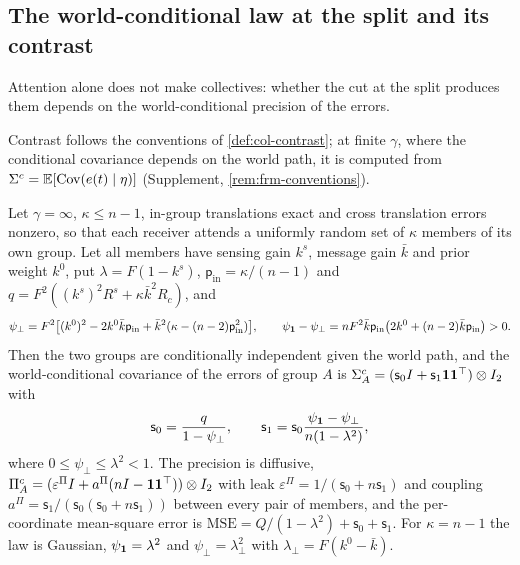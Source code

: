 \subsection{The world-conditional law at the split and its contrast}\label{sec:frm-contrast}

Attention alone does not make collectives: whether the cut at the split produces them depends on the world-conditional precision of the errors.

Contrast follows the conventions of \cref{def:col-contrast}; at finite $\gamma$, where the conditional covariance depends on the world path, it is computed from $\Sigma^c=\mathbb{E}[\operatorname{Cov}(e(t)\mid\eta)]$ (Supplement, \cref{rem:frm-conventions}).

\begin{lemma}\label{lem:frm-split-law}
Let $\gamma=\infty$, $\kappa\le n-1$, in-group translations exact and cross translation errors nonzero, so that each receiver attends a uniformly random set of $\kappa$ members of its own group. Let all members have sensing gain $k^s$, message gain $\bar k$ and prior weight $k^0$, put $\lambda=F(1-k^s)$, $\mathsf p_{\mathrm{in}}=\kappa/(n-1)$ and $q=F^2((k^s)^2R^s+\kappa\bar k^2R_c)$, and
\begin{equation*}
\psi_\perp=F^2\bigl[(k^0)^2-2k^0\bar k\mathsf p_{\mathrm{in}}+\bar k^2(\kappa-(n-2)\mathsf p_{\mathrm{in}}^2)\bigr],\qquad\psi_{\mathbf{1}}-\psi_\perp=nF^2\bar k\mathsf p_{\mathrm{in}}\bigl(2k^0+(n-2)\bar k\mathsf p_{\mathrm{in}}\bigr)>0.
\end{equation*}
Then the two groups are conditionally independent given the world path, and the world-conditional covariance of the errors of group $A$ is $\Sigma^c_A=(\mathsf s_0I+\mathsf s_1\mathbf{1}\mathbf{1}^\top)\otimes I_2$ with
\begin{equation*}
\mathsf s_0=\frac{q}{1-\psi_\perp},\qquad\mathsf s_1=\mathsf s_0\frac{\psi_{\mathbf{1}}-\psi_\perp}{n(1-\lambda^2)},
\end{equation*}
where $0\le\psi_\perp\le\lambda^2<1$. The precision is diffusive, $\Pi^c_A=(\varepsilon^\Pi I+a^\Pi(nI-\mathbf{1}\mathbf{1}^\top))\otimes I_2$ with leak $\varepsilon^\Pi=1/(\mathsf s_0+n\mathsf s_1)$ and coupling $a^\Pi=\mathsf s_1/(\mathsf s_0(\mathsf s_0+n\mathsf s_1))$ between every pair of members, and the per-coordinate mean-square error is $\mathrm{MSE}=Q/(1-\lambda^2)+\mathsf s_0+\mathsf s_1$. For $\kappa=n-1$ the law is Gaussian, $\psi_{\mathbf{1}}=\lambda^2$ and $\psi_\perp=\lambda_\perp^2$ with $\lambda_\perp=F(k^0-\bar k)$.
\end{lemma}
